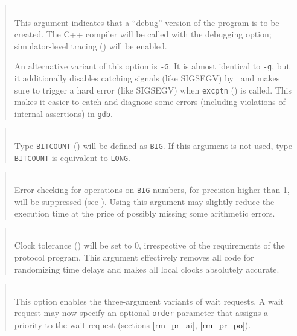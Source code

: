 \begin{quote}
\noindent{}\\ \hspace{0in}
This argument indicates that a ``debug'' version of the program is to be
created.
The C++ compiler will be called with the debugging option;
simulator-level tracing () will be enabled.

\noindent
An alternative variant of this option is {\tt -G}.
It is almost identical to {\tt -g}, but it additionally disables catching 
signals (like SIGSEGV) by \smurph\ and makes sure to trigger a hard error
(like SIGSEGV) when {\tt excptn} () is called.
This makes it easier to catch and diagnose some errors (including violations
of internal assertions) in {\tt gdb}.
\end{quote}

\begin{quote}
\noindent{}\\ \hspace{0in}
Type {\tt BITCOUNT} () will be defined as {\tt BIG}.
If this argument is not used, type {\tt BITCOUNT} is equivalent to {\tt LONG}.
\end{quote}

\begin{quote}
\noindent{}\\ \hspace{0in}
Error checking for operations on {\tt BIG} numbers, for
precision higher than 1, will be suppressed (see ).
Using this argument may slightly reduce the execution time at the price
of possibly missing some arithmetic errors.
\end{quote}

\begin{quote}
\noindent{}\\ \hspace{0in}
Clock tolerance ()
will be set to 0, irrespective of the requirements of the
protocol program.
This argument effectively removes all code for randomizing time delays and
makes all local clocks absolutely accurate.
\end{quote}

\begin{quote}
\noindent{}\\ \hspace{0in}
This option enables the three-argument variants of wait requests.
A wait request may now specify an optional {\tt order} parameter that
assigns a priority to the wait request (sections \ref{rm_pr_ai},
\ref{rm_pr_po}).
\end{quote}

